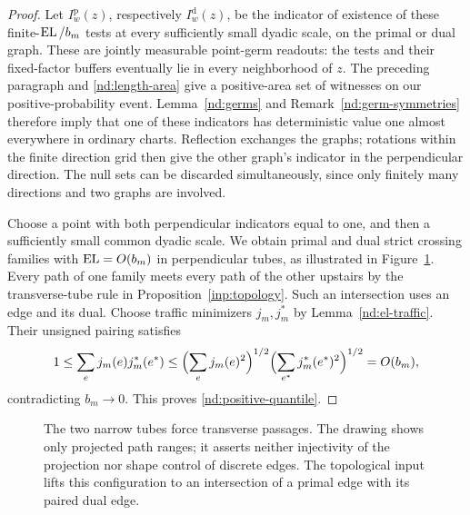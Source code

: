 \begin{proof}
Let $I^{\mathrm p}_w(z)$, respectively $I^{\mathrm d}_w(z)$, be the
indicator of existence of these finite-$\operatorname{EL}/b_m$ tests at every
sufficiently small dyadic scale, on the primal or dual graph.
These are jointly measurable point-germ readouts: the tests and
their fixed-factor buffers eventually lie in every neighborhood
of $z$.  The preceding paragraph and \eqref{nd:length-area} give
a positive-area set of witnesses on our positive-probability
event.  Lemma~\ref{nd:germs} and
Remark~\ref{nd:germ-symmetries} therefore imply that one of these
indicators has deterministic value one almost everywhere in
ordinary charts.  Reflection exchanges the graphs; rotations
within the finite direction grid then give the other graph's
indicator in the perpendicular direction.  The null sets can
be discarded simultaneously, since only finitely many directions
and two graphs are involved.

Choose a point with both perpendicular indicators equal to one,
and then a sufficiently small common dyadic scale.  We obtain
primal and dual strict crossing families with
$\operatorname{EL}=O(b_m)$ in perpendicular tubes, as illustrated in
Figure~\ref{nd:transverse-figure}.  Every path of one family meets
every path of the other upstairs by the transverse-tube rule in
Proposition~\ref{inp:topology}.  Such an intersection uses an edge
and its dual.  Choose traffic minimizers $j_m,j_m^*$ by
Lemma~\ref{nd:el-traffic}.  Their unsigned pairing satisfies
\[
 1\le\sum_e j_m(e)j_m^*(e^*)
    \le\Bigl(\sum_e j_m(e)^2\Bigr)^{1/2}
       \Bigl(\sum_{e^*}j_m^*(e^*)^2\Bigr)^{1/2}
    =O(b_m),
\]
contradicting $b_m\to0$.  This proves
\eqref{nd:positive-quantile}.
\end{proof}

\begin{figure}[t]
\centering
{}
\caption{The two narrow tubes force transverse passages.  The drawing
shows only projected path ranges; it asserts neither injectivity of
the projection nor shape control of discrete edges.  The topological
input lifts this configuration to an intersection of a primal edge
with its paired dual edge.}
\label{nd:transverse-figure}
\end{figure}

